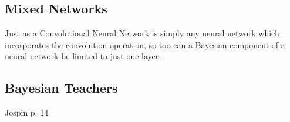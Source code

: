 \subsection{Mixed Networks}
Just as a Convolutional Neural Network is simply any neural network which incorporates the convolution operation, so too can a Bayesian component of a neural network be limited to just one layer.

\subsection{Bayesian Teachers}
Jospin p. 14


